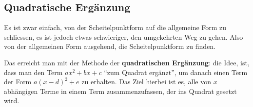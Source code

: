 \documentclass[12pt]{article}
\begin{document}
%
%


\subsection{Quadratische Ergänzung}\label{subsec:qudratische_ergaenzung}
Es ist zwar einfach, von der Scheitelpunktform auf die allgemeine Form zu schliessen, es ist jedoch etwas schwieriger, den umgekehrten Weg zu gehen. Also von der allgemeinen Form ausgehend, die Scheitelpunktform zu finden.


Das erreicht man mit der Methode der \textbf{quadratischen Ergänzung}: die Idee, ist, dass man den Term $ax^2+bx + c$ ``zum Quadrat ergänzt'', um danach einen Term der Form $a(x-d)^2 + e$ zu erhalten. Das Ziel hierbei ist es, alle von $x$ abhängigen Terme in einem Term zusammenzufassen, der ins Quadrat gesetzt wird.
\end{document}
